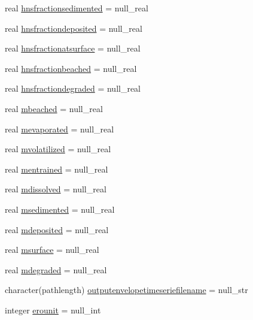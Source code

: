 \begin{DoxyCompactItemize}
\item 
real \mbox{\hyperlink{structmodulelagrangianglobal_1_1t__origin_a510d57e28daff8f8f2d9e3e50c5805b5}{hnsfractionsedimented}} = null\+\_\+real
\item 
real \mbox{\hyperlink{structmodulelagrangianglobal_1_1t__origin_a991262cc0fb4495a2a045bb69d04a82f}{hnsfractiondeposited}} = null\+\_\+real
\item 
real \mbox{\hyperlink{structmodulelagrangianglobal_1_1t__origin_ab9aefb03a2923773393b97e6a0da4d07}{hnsfractionatsurface}} = null\+\_\+real
\item 
real \mbox{\hyperlink{structmodulelagrangianglobal_1_1t__origin_a2001d520bbbc1854a77aaa329e1fc4e9}{hnsfractionbeached}} = null\+\_\+real
\item 
real \mbox{\hyperlink{structmodulelagrangianglobal_1_1t__origin_a20203e70b76d2c464560899cf9db3c3e}{hnsfractiondegraded}} = null\+\_\+real
\item 
real \mbox{\hyperlink{structmodulelagrangianglobal_1_1t__origin_a0445c78eab81f7a29160bdfd51ea78a2}{mbeached}} = null\+\_\+real
\item 
real \mbox{\hyperlink{structmodulelagrangianglobal_1_1t__origin_abc1e6eb55dd5f9cdb518d32325035ab0}{mevaporated}} = null\+\_\+real
\item 
real \mbox{\hyperlink{structmodulelagrangianglobal_1_1t__origin_a9006cc16edf60cfa0088814726410fb1}{mvolatilized}} = null\+\_\+real
\item 
real \mbox{\hyperlink{structmodulelagrangianglobal_1_1t__origin_a85f8f13f5337a9a2046dfd7855e1a3eb}{mentrained}} = null\+\_\+real
\item 
real \mbox{\hyperlink{structmodulelagrangianglobal_1_1t__origin_a5960abc17a89d66b5bef36f49dae7235}{mdissolved}} = null\+\_\+real
\item 
real \mbox{\hyperlink{structmodulelagrangianglobal_1_1t__origin_a58a0f6f284b984dcce841e6859e83e1d}{msedimented}} = null\+\_\+real
\item 
real \mbox{\hyperlink{structmodulelagrangianglobal_1_1t__origin_a1de36e39536f9751af919b2cf6a1e957}{mdeposited}} = null\+\_\+real
\item 
real \mbox{\hyperlink{structmodulelagrangianglobal_1_1t__origin_a8ace91dbbb148b8e8d1a18584798cf43}{msurface}} = null\+\_\+real
\item 
real \mbox{\hyperlink{structmodulelagrangianglobal_1_1t__origin_a8d5fb6dcb72c418cfdab2190237b1412}{mdegraded}} = null\+\_\+real
\item 
character(pathlength) \mbox{\hyperlink{structmodulelagrangianglobal_1_1t__origin_a498337ea434978d6bfc7caa003ba544f}{outputenvelopetimeseriefilename}} = null\+\_\+str
\item 
integer \mbox{\hyperlink{structmodulelagrangianglobal_1_1t__origin_a97cc64a557a26a677b4b06a4154116d6}{erounit}} = null\+\_\+int
\end{DoxyCompactItemize}


